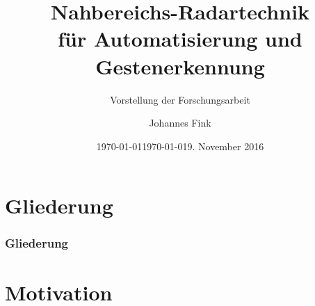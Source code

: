 \documentclass[16pt]{beamer}
\title[Nahbereichs-Radartechnik f\"{u}r Automatisierung und Gestenerkennung]{Nahbereichs-Radartechnik \\ f\"{u}r Automatisierung und Gestenerkennung}
\subtitle{Vorstellung der Forschungsarbeit}
\author[J. Fink]{Johannes Fink}
\date{\americandate\today}
\date{\germandate\today}
\institute{Communications Engineering Lab}
\date{9. November 2016}
\begin{document}
\begin{frame}
\titlepage
\end{frame}

%

\section*{Gliederung}

\begin{frame}
\frametitle{Gliederung}
	\tableofcontents
\end{frame}



\section{Motivation}
\end{document}
